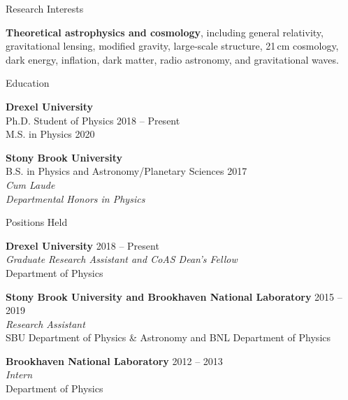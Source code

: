 \documentclass{resume} %
\begin{document}


\begin{rSection}{Research Interests}

\textbf{Theoretical astrophysics and cosmology}, including general relativity, gravitational lensing, modified gravity, large-scale structure, 21\,cm cosmology, dark energy, inflation, dark matter, radio astronomy, and gravitational waves. 

\end{rSection}


\begin{rSection}{Education}

\textbf{Drexel University} \\%
{\color{MidnightBlue} Ph.D.} Student of Physics \hfill {2018 -- Present} \\
{\color{MidnightBlue} M.S.} in Physics \hfill{2020}

\textbf{Stony Brook University} \\%
{\color{MidnightBlue} B.S.} in Physics and Astronomy/Planetary Sciences \hfill{2017}\\
\textit{Cum Laude}\\
\textit{Departmental Honors in Physics}

\end{rSection}


\begin{rSection}{Positions Held}

\textbf{Drexel University} \hfill {2018 -- Present} \\
\textit{Graduate Research Assistant and CoAS Dean's Fellow}\\
Department of Physics

\textbf{Stony Brook University and Brookhaven National Laboratory} \hfill {2015 -- 2019}\\
\textit{Research Assistant}\\
SBU Department of Physics \& Astronomy  and BNL Department of Physics

\textbf{Brookhaven National Laboratory} \hfill {2012 -- 2013}\\
\textit{Intern}\\
Department of Physics

\end{rSection}
\end{document}
